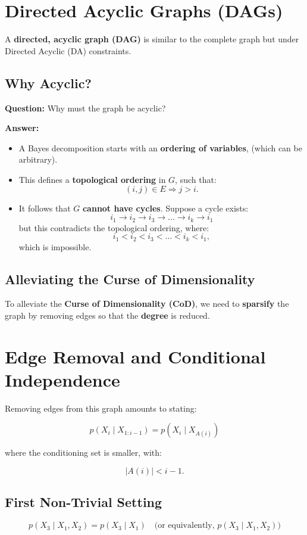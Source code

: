 \documentclass{article}%
\begin{document}
\section*{Directed Acyclic Graphs (DAGs)}
A \textbf{directed, acyclic graph (DAG)} is similar to the complete graph but under Directed Acyclic (DA) constraints.

\subsection*{Why Acyclic?}
\textbf{Question:} Why must the graph be acyclic?

\textbf{Answer:}
\begin{itemize}
    \item A Bayes decomposition starts with an \textbf{ordering of variables}, (which can be arbitrary).
    \item This defines a \textbf{topological ordering} in \( G \), such that:
          \[
          (i, j) \in E \Rightarrow j > i.
          \]
    \item It follows that \( G \) \textbf{cannot have cycles}. Suppose a cycle exists:
          \[
          i_1 \to i_2 \to i_3 \to \dots \to i_k \to i_1
          \]
          but this contradicts the topological ordering, where:
          \[
          i_1 < i_2 < i_3 < \dots < i_k < i_1,
          \]
          which is impossible.
\end{itemize}

\subsection*{Alleviating the Curse of Dimensionality}
To alleviate the \textbf{Curse of Dimensionality (CoD)}, we need to \textbf{sparsify} the graph by removing edges so that the \textbf{degree} is reduced.


\section*{Edge Removal and Conditional Independence}
Removing edges from this graph amounts to stating:

\[
p(X_i \mid X_{1:i-1}) = p(X_i \mid X_{A(i)})
\]

where the conditioning set is smaller, with:

\[
|A(i)| < i - 1.
\]

\subsection*{First Non-Trivial Setting}
\[
p(X_3 \mid X_1, X_2) = p(X_3 \mid X_1) \quad \text{(or equivalently, } p(X_3 \mid X_1, X_2) \text{)}
\]
\end{document}
